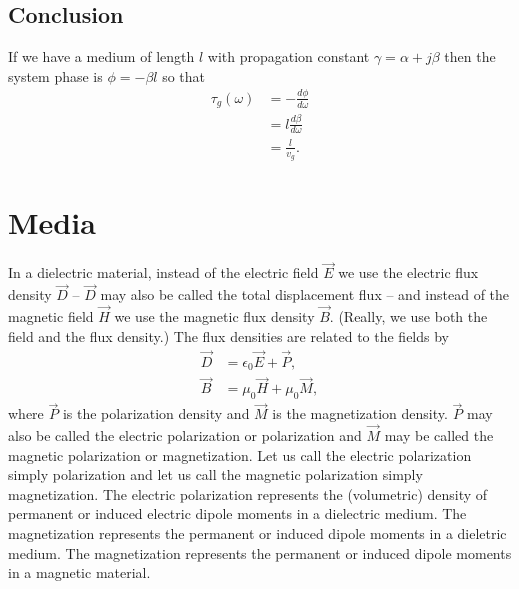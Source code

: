 \documentclass{article}
\begin{document}
		\subsection{Conclusion}
If we have a medium of length $l$ with propagation constant $\gamma=\alpha+j\beta$ then the system phase is $\phi=-\beta{l}$ so that
\begin{equation}
	\begin{split}
		\tau_g(\omega)&=-\frac{d\phi}{d\omega}\\
		&=l\frac{d\beta}{d\omega}\\
		&=\frac{l}{v_g}.
	\end{split}
\end{equation}

	\section{Media}
In a dielectric material, instead of the electric field $\vec{E}$ we use the electric flux density $\vec{D}$ -- $\vec{D}$ may also be called the total displacement flux -- and instead of the magnetic field $\vec{H}$ we use the magnetic flux density $\vec{B}$. (Really, we use both the field and the flux density.) The flux densities are related to the fields by
\begin{align}
	\vec{D}&=\epsilon_0\vec{E}+\vec{P},\\
	\vec{B}&=\mu_0\vec{H}+\mu_0\vec{M},
\end{align}
where $\vec{P}$ is the polarization density and $\vec{M}$ is the magnetization density. $\vec{P}$ may also be called the electric polarization or polarization and $\vec{M}$ may be called the magnetic polarization or magnetization. Let us call the electric polarization simply polarization and let us call the magnetic polarization simply magnetization. The electric polarization represents the (volumetric) density of permanent or induced electric dipole moments in a dielectric medium. The magnetization represents the permanent  or induced dipole moments in a dieletric medium. The magnetization represents the permanent or induced dipole moments in a magnetic material.
\end{document}
